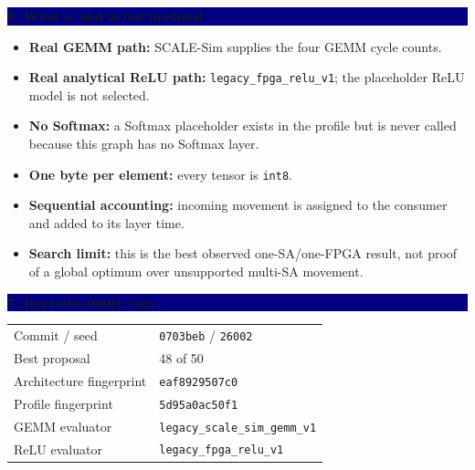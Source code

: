 \documentclass[10pt]{article}
\newcommand{\sectionbar}[1]{\vspace{0.5em}\noindent
  \colorbox{navy}{\parbox{\dimexpr\linewidth-2\fboxsep\relax}{
  \color{white}\large\bfseries #1}}\par\vspace{0.35em}}
\begin{document}
\sectionbar{6. What is and is not modeled}
\begin{itemize}
\item \textbf{Real GEMM path:} SCALE-Sim supplies the four GEMM cycle counts.
\item \textbf{Real analytical ReLU path:} \texttt{legacy\_fpga\_relu\_v1}; the
placeholder ReLU model is not selected.
\item \textbf{No Softmax:} a Softmax placeholder exists in the profile but is
never called because this graph has no Softmax layer.
\item \textbf{One byte per element:} every tensor is \texttt{int8}.
\item \textbf{Sequential accounting:} incoming movement is assigned to the
consumer and added to its layer time.
\item \textbf{Search limit:} this is the best observed one-SA/one-FPGA result,
not proof of a global optimum over unsupported multi-SA movement.
\end{itemize}

\sectionbar{7. Reproducibility tags}
\begin{tabularx}{\linewidth}{@{}L Y@{}}
\toprule
Commit / seed & \texttt{0703beb} / \texttt{26002} \\
Best proposal & 48 of 50 \\
Architecture fingerprint & \texttt{eaf8929507c0} \\
Profile fingerprint & \texttt{5d95a0ac50f1} \\
GEMM evaluator & \texttt{legacy\_scale\_sim\_gemm\_v1} \\
ReLU evaluator & \texttt{legacy\_fpga\_relu\_v1} \\
\bottomrule
\end{tabularx}
\end{document}
